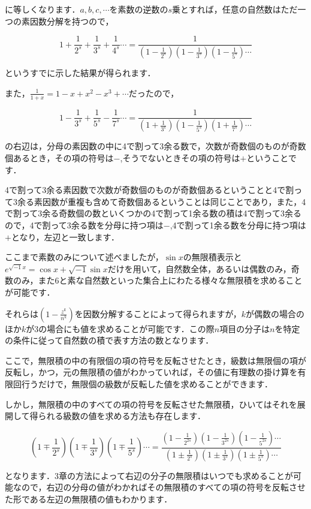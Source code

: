\documentclass[./main]{subfiles}
\theoremstyle{break}
\begin{document}
に等しくなります．$a,b,c,\cdots$を素数の逆数の$s$乗とすれば，任意の自然数はただ一つの素因数分解を持つので，

\[1+\frac{1}{2^s}+\frac{1}{3^s}+\frac{1}{4^s}\cdots =\frac{1}{\left( 1-\frac{1}{2^s} \right)\left( 1-\frac{1}{3^s} \right)\left( 1-\frac{1}{5^s} \right)\cdots}\]

というすでに示した結果が得られます．

また，$\frac{1}{1+x}=1-x+x^2-x^3+\cdots$だったので，

\[1-\frac{1}{3^s}+\frac{1}{5^s}-\frac{1}{7^s}\cdots =\frac{1}{\left( 1+\frac{1}{3^s} \right)\left( 1-\frac{1}{5^s} \right)\left( 1+\frac{1}{7^s} \right)\cdots}\]

の右辺は，分母の素因数の中に4で割って3余る数で，次数が奇数個のものが奇数個あるとき，その項の符号は$-$,そうでないときその項の符号は$+$ということです．

4で割って3余る素因数で次数が奇数個のものが奇数個あるということと4で割って3余る素因数が重複も含めて奇数個あるということは同じことであり，また，4で割って3余る奇数個の数といくつかの4で割って1余る数の積は4で割って3余るので，4で割って3余る数を分母に持つ項は$-$,4で割って1余る数を分母に持つ項は$+$となり，左辺と一致します．

ここまで素数のみについて述べましたが，$\sin x$の無限積表示と$e^{\sqrt{-1}x}=\cos x+\sqrt{-1}\sin x$だけを用いて，自然数全体，あるいは偶数のみ，奇数のみ，また6と素な自然数といった集合上にわたる様々な無限積を求めることが可能です．

それらは$\left( 1-\frac{z^k}{n^k} \right)$を因数分解することによって得られますが，$k$が偶数の場合のほか$k$が3の場合にも値を求めることが可能です．この際$n$項目の分子は$n$を特定の条件に従って自然数の積で表す方法の数となります．

ここで，無限積の中の有限個の項の符号を反転させたとき，級数は無限個の項が反転し，かつ，元の無限積の値がわかっていれば，その値に有理数の掛け算を有限回行うだけで，無限個の級数が反転した値を求めることができます．

しかし，無限積の中のすべての項の符号を反転させた無限積，ひいてはそれを展開して得られる級数の値を求める方法も存在します．

\[\left( 1\mp \frac{1}{2^s} \right)\left( 1\mp \frac{1}{3^s} \right)\left( 1\mp\frac{1}{5^s} \right)\cdots=\frac{\left( 1-\frac{1}{2^{2s}} \right)\left( 1-\frac{1}{3^{2s}} \right)\left( 1-\frac{1}{5^{2s}} \right)\cdots}{\left( 1\pm \frac{1}{2^s} \right)\left( 1\pm \frac{1}{3^s} \right)\left( 1\pm\frac{1}{5^s} \right)\cdots}\]

となります．3章の方法によって右辺の分子の無限積はいつでも求めることが可能なので，右辺の分母の値がわかればその無限積のすべての項の符号を反転させた形である左辺の無限積の値もわかります．
\end{document}
